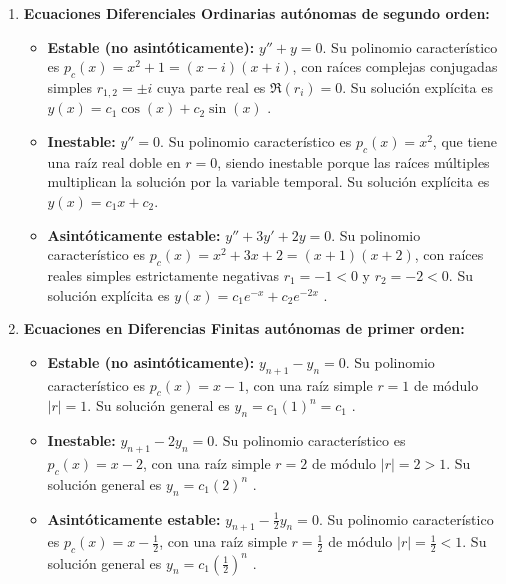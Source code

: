\begin{sol}
\begin{enumerate}
    \item \textbf{Ecuaciones Diferenciales Ordinarias autónomas de segundo orden:}
    \begin{itemize}
        \item \textbf{Estable (no asintóticamente):} $y'' + y = 0$. Su polinomio característico es $p_c(x) = x^2 + 1 = (x - i)(x + i)$, con raíces complejas conjugadas simples $r_{1,2} = \pm i$ cuya parte real es $\Re(r_i) = 0$. Su solución explícita es $y(x) = c_1 \cos(x) + c_2 \sin(x)$ .
        \item \textbf{Inestable:} $y'' = 0$. Su polinomio característico es $p_c(x) = x^2$, que tiene una raíz real doble en $r = 0$, siendo inestable porque las raíces múltiples multiplican la solución por la variable temporal. Su solución explícita es $y(x) = c_1 x + c_2$.
        \item \textbf{Asintóticamente estable:} $y'' + 3y' + 2y = 0$. Su polinomio característico es $p_c(x) = x^2 + 3x + 2 = (x + 1)(x + 2)$, con raíces reales simples estrictamente negativas $r_1 = -1 < 0$ y $r_2 = -2 < 0$. Su solución explícita es $y(x) = c_1 e^{-x} + c_2 e^{-2x}$ .
    \end{itemize}

    \item \textbf{Ecuaciones en Diferencias Finitas autónomas de primer orden:}
    \begin{itemize}
        \item \textbf{Estable (no asintóticamente):} $y_{n+1} - y_n = 0$. Su polinomio característico es $p_c(x) = x - 1$, con una raíz simple $r = 1$ de módulo $|r| = 1$. Su solución general es $y_n = c_1 (1)^n = c_1$ .
        \item \textbf{Inestable:} $y_{n+1} - 2y_n = 0$. Su polinomio característico es $p_c(x) = x - 2$, con una raíz simple $r = 2$ de módulo $|r| = 2 > 1$. Su solución general es $y_n = c_1 (2)^n$ .
        \item \textbf{Asintóticamente estable:} $y_{n+1} - \frac{1}{2}y_n = 0$. Su polinomio característico es $p_c(x) = x - \frac{1}{2}$, con una raíz simple $r = \frac{1}{2}$ de módulo $|r| = \frac{1}{2} < 1$. Su solución general es $y_n = c_1 \left(\frac{1}{2}\right)^n$ .
    \end{itemize}
\end{enumerate}
\end{sol}

\vspace{0.5cm}

